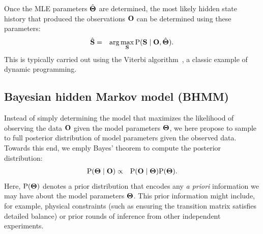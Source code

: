 \documentclass[aps,pre,twocolumn,superscriptaddress,nofootinbib,longbibliography]{revtex4-1}
\newcommand{\bfm}[1]{{\bf #1}}
\renewcommand{\Pr}{\mathrm{P}}
\begin{document}
{Once the MLE parameters $\hat{\bfm{\Theta}}$ are determined, the most likely hidden state history that produced the observations $\bfm{O}$ can be determined using these parameters:
\begin{eqnarray}
\hat{\bfm{S}} &=& \arg\max_\bfm{S} \Pr(\bfm{S} \mid \bfm{O}, \hat{\bfm{\Theta}}) .
\end{eqnarray}
This is typically carried out using the Viterbi algorithm~\cite{viterbi:1967:IEEE-trans-info-theory:viterbi-algorithm}, a classic example of dynamic programming.


\subsection{Bayesian hidden Markov model (BHMM)}

Instead of simply determining the model that maximizes the likelihood of observing the data $\bfm{O}$ given the model parameters $\bfm{\Theta}$, {\color{magenta} we here propose to sample to full posterior distribution of model parameters given the observed data. 
Towards this end, we emply Bayes' theorem to compute the posterior distribution:}
\begin{eqnarray}
\Pr(\bfm{\Theta} \mid \bfm{O}) &\propto& \Pr(\bfm{O} \mid \bfm{\Theta}) \Pr(\bfm{\Theta}) \label{equation:bayes-theorem}.
\end{eqnarray}
Here, $\Pr(\bfm{\Theta})$ denotes a prior distribution that encodes any \emph{a priori} information we may have about the model parameters $\bfm{\Theta}$.
This prior information might include, for example, physical constraints (such as ensuring the transition matrix satisfies detailed balance) or prior rounds of inference from other independent experiments.

}
\end{document}
